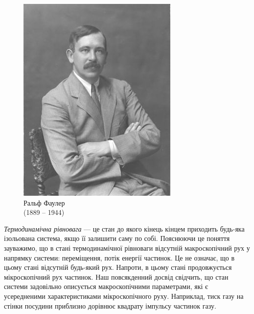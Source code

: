 \begin{figure}
\includegraphics[width=\linewidth]{Lec1/Fowler}
\caption*{Ральф Фаулер\\(1889 -- 1944)}
\end{figure}
\emph{Термодинамічна рівновага} --- це стан до якого кінець кінцем приходить будь-яка ізольована система, якщо її залишити саму по собі. Пояснюючи це поняття зауважимо, що в стані термодинамічної рівноваги відсутній макроскопічний рух у напрямку системи: переміщення, потік енергії частинок. Це не означає, що в цьому стані відсутній будь-який рух. Напроти, в цьому стані продовжується мікроскопічний рух частинок. Наш повсякденний досвід свідчить, що стан системи задовільно описується  макроскопічними параметрами, які є усередненими характеристиками мікроскопічного руху. Наприклад, тиск газу на стінки посудини приблизно дорівнює квадрату імпульсу частинок газу.

